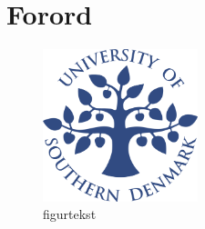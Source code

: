 \setcounter{page}{1}
\section{Forord}
\begin{figure}[th!]
\centering
\includegraphics[width=0.4\textwidth]{./graphics/forside}
\caption[tekst i indholdsfortegnelsen]{figurtekst}
\label{fig:}
\end{figure}